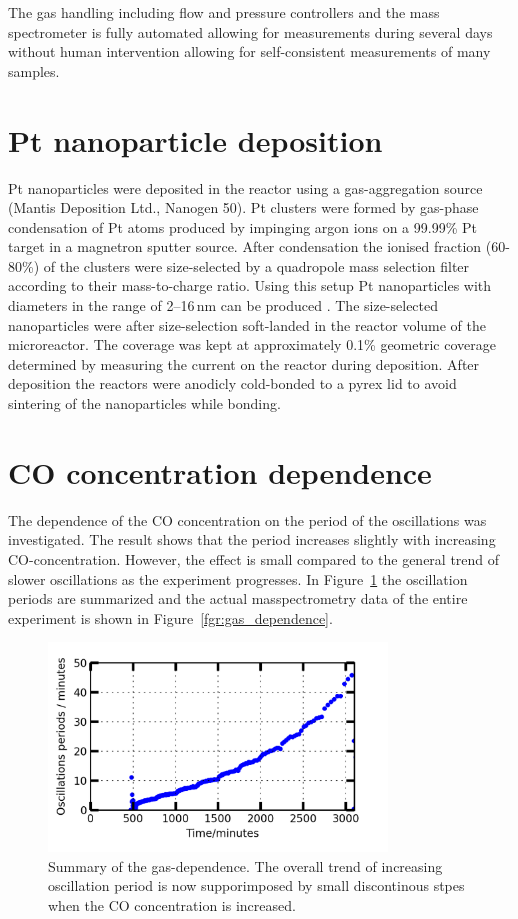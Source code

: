 \documentclass[8.5pt,twoside,twocolumn]{article}
\begin{document}
The gas handling including flow and pressure controllers and the mass spectrometer is fully automated allowing for measurements during several days without human intervention allowing for self-consistent measurements of many samples.

\section{Pt nanoparticle deposition}
Pt nanoparticles were deposited in the reactor using a gas-aggregation source (Mantis Deposition Ltd., Nanogen 50). Pt clusters were formed by gas-phase condensation of Pt atoms produced by impinging argon ions on a 99.99\% Pt target in a magnetron sputter source. After condensation the ionised fraction (60-80\%) of the clusters were size-selected by a quadropole mass selection filter according to their mass-to-charge ratio. Using this setup Pt nanoparticles with diameters in the range of 2--16\,nm can be produced \cite{Nielsen2010,Nielsen2009}. The size-selected nanoparticles were after size-selection soft-landed in the reactor volume of the microreactor. The coverage was kept at approximately 0.1\% geometric coverage determined by measuring the current on the reactor during deposition. After deposition the reactors were anodicly cold-bonded \cite{Vesborg2010} to a pyrex lid to avoid sintering of the nanoparticles while bonding.

\section{CO concentration dependence}
The dependence of the CO concentration on the period of the oscillations was investigated. The result shows that the period increases slightly with increasing CO-concentration. However, the effect is small compared to the general trend of slower oscillations as the experiment progresses. In Figure~\ref{fgr:gas_dependence_summary} the oscillation periods are summarized and the actual masspectrometry data of the entire experiment is shown in Figure~\ref{fgr:gas_dependence}.

\begin{figure}[h]
  \centering
  \includegraphics[width=9cm]{oscillations_gas_dependence_summary_supplemental.png}
  \caption{Summary of the gas-dependence. The overall trend of increasing oscillation period is now supporimposed by small discontinous stpes when the CO concentration is increased.}
  \label{fgr:gas_dependence_summary}
\end{figure}
\end{document}
